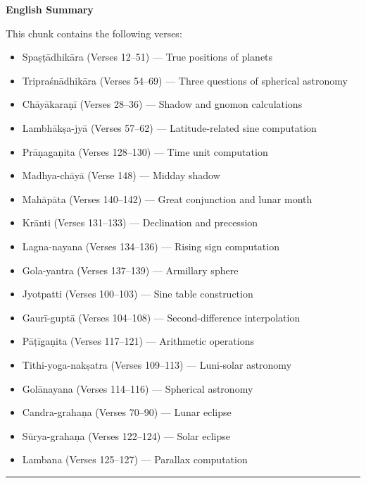 \documentclass[11pt,a4paper]{article}
\newcommand{\longline}{\noindent\rule{\textwidth}{0.4pt}}
\begin{document}
\begin{minipage}[t]{0.48\textwidth}
\small
\textbf{English Summary}

This chunk contains the following verses:
\begin{itemize}[leftmargin=*,nosep]
\item Spa\d{s}\d{t}\=adhik\=ara (Verses 12--51) --- True positions of planets
\item Tripra\'sn\=adhik\=ara (Verses 54--69) --- Three questions of spherical astronomy
\item Ch\=ay\=akara\d{n}\=i (Verses 28--36) --- Shadow and gnomon calculations
\item Lambh\=ak\d{s}a-jy\=a (Verses 57--62) --- Latitude-related sine computation
\item Pr\=a\d{n}aga\d{n}ita (Verses 128--130) --- Time unit computation
\item Madhya-ch\=ay\=a (Verse 148) --- Midday shadow
\item Mah\=ap\=ata (Verses 140--142) --- Great conjunction and lunar month
\item Kr\=anti (Verses 131--133) --- Declination and precession
\item Lagna-nayana (Verses 134--136) --- Rising sign computation
\item Gola-yantra (Verses 137--139) --- Armillary sphere
\item Jyotpatti (Verses 100--103) --- Sine table construction
\item Gaur\=i-gupt\=a (Verses 104--108) --- Second-difference interpolation
\item P\=a\d{t}\=iga\d{n}ita (Verses 117--121) --- Arithmetic operations
\item Tithi-yoga-nak\d{s}atra (Verses 109--113) --- Luni-solar astronomy
\item Gol\=anayana (Verses 114--116) --- Spherical astronomy
\item Candra-graha\d{n}a (Verses 70--90) --- Lunar eclipse
\item S\=urya-graha\d{n}a (Verses 122--124) --- Solar eclipse
\item Lambana (Verses 125--127) --- Parallax computation
\end{itemize}
\end{minipage}

\vspace{1em}
\longline

\end{document}
